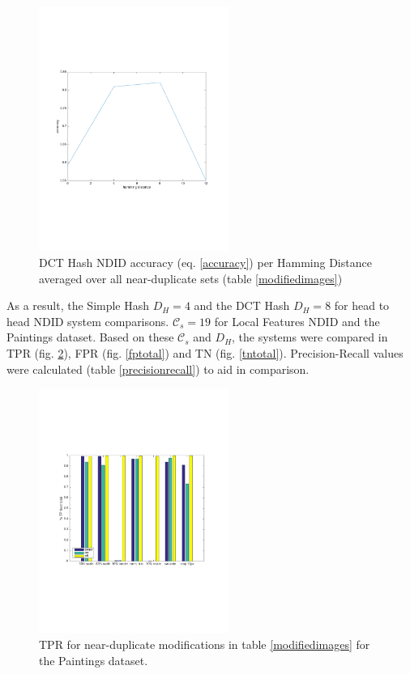 \documentclass[english,12pt,a4paper,pdftex,elec,utf8, table]{aaltothesis}
\begin{document}
\begin{figure}[htb]
\begin{center}
\includegraphics[height=8cm]{figures/dctTotalAccuracy}
\end{center}
\caption{DCT Hash NDID accuracy (eq. \ref{accuracy}) per Hamming Distance averaged over all near-duplicate sets (table \ref{modifiedimages})}
\label{dcttotalaccuracy}
\end{figure}

As a result, the Simple Hash $D_H=4$ and the DCT Hash $D_H=8$ for head to head NDID system comparisons. $\mathcal{C}_s=19$ for Local Features NDID and the Paintings dataset. Based on these $\mathcal{C}_s$ and $D_H$, the systems were compared in TPR (fig. \ref{tptotal}), FPR (fig. \ref{fptotal}) and TN (fig. \ref{tntotal}). Precision-Recall values were calculated (table \ref{precisionrecall}) to aid in comparison.

\begin{figure}[htb]
\begin{center}
\includegraphics[height=8cm]{figures/tpBar}
\end{center}
\caption{ TPR for near-duplicate modifications in table \ref{modifiedimages} for the Paintings dataset.}
\label{tptotal}
\end{figure}
\end{document}
